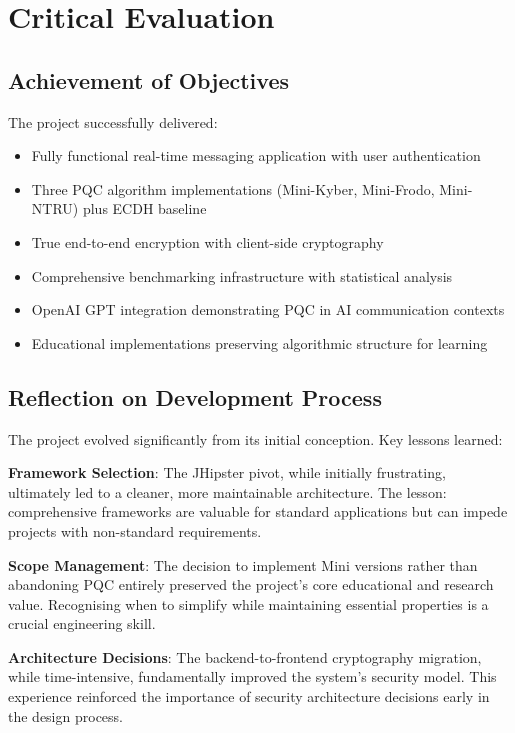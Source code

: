 \documentclass[11pt,a4paper]{article}
\begin{document}
\section{Critical Evaluation}

\subsection{Achievement of Objectives}

The project successfully delivered:
\begin{itemize}
    \item Fully functional real-time messaging application with user authentication
    \item Three PQC algorithm implementations (Mini-Kyber, Mini-Frodo, Mini-NTRU) plus ECDH baseline
    \item True end-to-end encryption with client-side cryptography
    \item Comprehensive benchmarking infrastructure with statistical analysis
    \item OpenAI GPT integration demonstrating PQC in AI communication contexts
    \item Educational implementations preserving algorithmic structure for learning
\end{itemize}

\subsection{Reflection on Development Process}

The project evolved significantly from its initial conception. Key lessons learned:

\textbf{Framework Selection}: The JHipster pivot, while initially frustrating, ultimately led to a cleaner, more maintainable architecture. The lesson: comprehensive frameworks are valuable for standard applications but can impede projects with non-standard requirements.

\textbf{Scope Management}: The decision to implement Mini versions rather than abandoning PQC entirely preserved the project's core educational and research value. Recognising when to simplify while maintaining essential properties is a crucial engineering skill.

\textbf{Architecture Decisions}: The backend-to-frontend cryptography migration, while time-intensive, fundamentally improved the system's security model. This experience reinforced the importance of security architecture decisions early in the design process.
\end{document}
